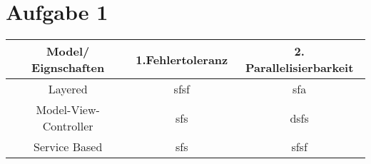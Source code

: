 \chapter*{Aufgabe 1}
\begin{center}
	\begin{tabular}	{|c|c|c|}
		\hline
		Model/ Eignschaften & 1.Fehlertoleranz & 2. Parallelisierbarkeit  \\
		\hline 
		Layered & sfsf &  sfa \\
		\hline 
		Model-View-Controller& sfs & dsfs \\
		\hline 
		Service Based& sfs & sfsf \\
		\hline 
	\end{tabular}
\end{center}

